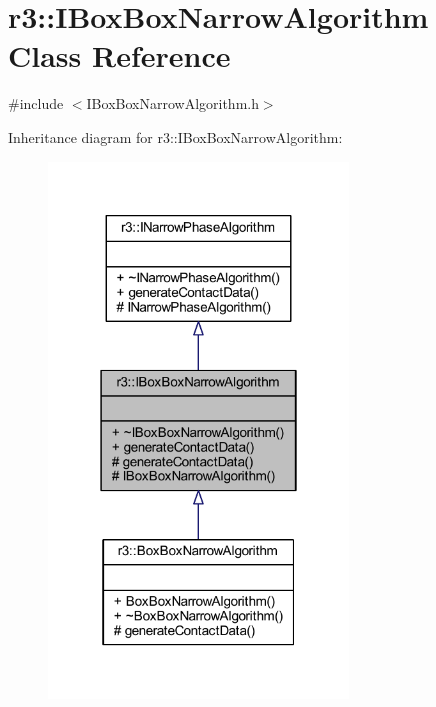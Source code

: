 \hypertarget{classr3_1_1_i_box_box_narrow_algorithm}{}\section{r3\+:\+:I\+Box\+Box\+Narrow\+Algorithm Class Reference}
\label{classr3_1_1_i_box_box_narrow_algorithm}


{\ttfamily \#include $<$I\+Box\+Box\+Narrow\+Algorithm.\+h$>$}



Inheritance diagram for r3\+:\+:I\+Box\+Box\+Narrow\+Algorithm\+:\nopagebreak
\begin{figure}[H]
\begin{center}
\leavevmode
\includegraphics[width=226pt]{classr3_1_1_i_box_box_narrow_algorithm__inherit__graph}
\end{center}
\end{figure}


